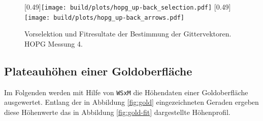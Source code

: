 \begin{figure}
    \centering
    [0.49\linewidth]{\texttt{[image: build/plots/hopg\_up-back\_selection.pdf]}}
    [0.49\linewidth]{\texttt{[image: build/plots/hopg\_up-back\_arrows.pdf]}}
    \caption{Vorselektion und Fitresultate der Bestimmung der Gittervektoren. HOPG Messung \num{4}.}
    \label{fig:hopg4_fit}
\end{figure}
\clearpage

\subsection{Plateauhöhen einer Goldoberfläche}
\label{subsec:gold}
Im Folgenden werden mit Hilfe von \texttt{WSxM} die Höhendaten einer
Goldoberfläche ausgewertet. Entlang der in Abbildung \ref{fig:gold}
eingezeichneten Geraden ergeben diese Höhenwerte das in Abbildung
\ref{fig:gold-fit} dargestellte Höhenprofil.

